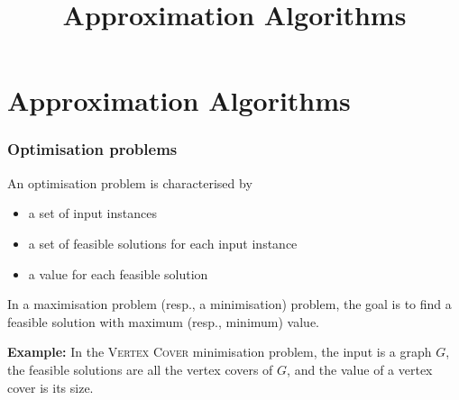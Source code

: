 

\newcommand{\vcpre}{\textsf{VC-preprocess}\xspace}




\title[Approximation]
{Approximation Algorithms}

\begin{frame}
  \titlepage
\end{frame}

\lecturenotes{\maketitle}

\begin{frame}
 \tableofcontents
\end{frame}


\section{Approximation Algorithms}

\begin{frame}
	\frametitle{Optimisation problems}
	
	\begin{definition}
		An \alert{optimisation problem} is characterised by
		\begin{itemize}
			\item a set of input instances
			\item a set of \alert{feasible solutions} for each input instance
			\item a \alert{value} for each feasible solution
		\end{itemize}
		In a \alert{maximisation} problem (resp., a \alert{minimisation}) problem, the goal is to find a feasible solution with maximum (resp., minimum) value.
	\end{definition}

	\noindent \textbf{Example:}
	In the \textsc{Vertex Cover} minimisation problem, the input is a graph $G$, the feasible solutions are all the vertex covers of $G$, and the value of a vertex cover is its size.
	
\end{frame}

